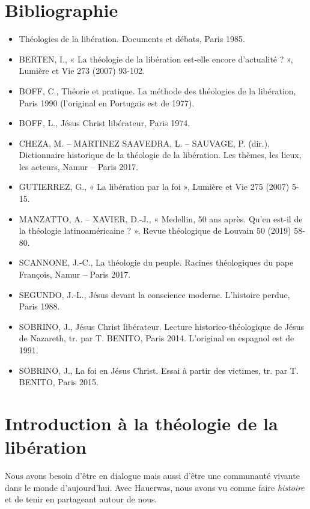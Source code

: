 

\section{Bibliographie}

\begin{itemize}
    \item 
Théologies de la libération. Documents et débats, Paris 1985.
    \item BERTEN, I., « La théologie de la libération est-elle encore d’actualité ? », Lumière et Vie 273
(2007) 93-102.
    \item BOFF, C., Théorie et pratique. La méthode des théologies de la libération, Paris 1990
(l’original en Portugais est de 1977).
    \item BOFF, L., Jésus Christ libérateur, Paris 1974.
    \item CHEZA, M. – MARTINEZ SAAVEDRA, L. – SAUVAGE, P. (dir.), Dictionnaire historique de la
théologie de la libération. Les thèmes, les lieux, les acteurs, Namur – Paris 2017.
    \item GUTIERREZ, G., « La libération par la foi », Lumière et Vie 275 (2007) 5-15.
    \item MANZATTO, A. – XAVIER, D.-J., « Medellin, 50 ans après. Qu’en est-il de la théologie latinoaméricaine
? », Revue théologique de Louvain 50 (2019) 58-80.
    \item SCANNONE, J.-C., La théologie du peuple. Racines théologiques du pape François, Namur –
Paris 2017.
    \item SEGUNDO, J.-L., Jésus devant la conscience moderne. L’histoire perdue, Paris 1988.
    \item SOBRINO, J., Jésus Christ libérateur. Lecture historico-théologique de Jésus de Nazareth, tr.
par T. BENITO, Paris 2014. L’original en espagnol est de 1991.
    \item SOBRINO, J., La foi en Jésus Christ. Essai à partir des victimes, tr. par T. BENITO, Paris 2015.

\end{itemize}

\section{Introduction à la théologie de la libération}

\begin{Synthesis}
Nous avons besoin d'être en dialogue mais aussi d'être une communauté vivante dans le monde d'aujourd'hui. Avec Hauerwas, nous avons vu comme faire \textit{histoire} et de tenir en partageant autour de nous.
\end{Synthesis}


